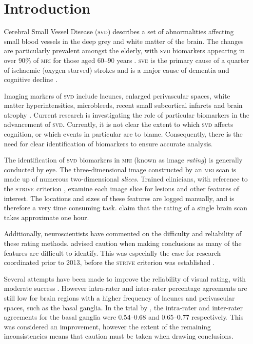 %
%

\chapter{Introduction}\label{s-intro}

{\noindent} Cerebral Small Vessel Disease (\textsc{svd}) describes a set of abnormalities affecting small blood vessels in the deep grey and white matter of the brain. The changes are particularly prevalent amongst the elderly, with \textsc{svd} biomarkers appearing in over 90\% of \textsc{mri} for those aged 60--90 years \citep{deLeeuwF-E2001Pocw}. \textsc{svd} is the primary cause of a quarter of ischaemic (oxygen-starved) strokes \citep{WardlawJ.M.2013Nsfr} and is a major cause of dementia and cognitive decline \citep{NorrvingBo2008Linb}.

Imaging markers of \textsc{svd} include lacunes, enlarged perivascular spaces, white matter hyperintensities, microbleeds, recent small subcortical infarcts and brain atrophy \citep{WardlawJ.M.2013Nsfr}. Current research is investigating the role of particular biomarkers in the advancement of \textsc{svd}. Currently, it is not clear the extent to which \textsc{svd} affects cognition, or which events in particular are to blame. Consequently, there is the need for clear identification of biomarkers to ensure accurate analysis.

The identification of \textsc{svd} biomarkers in \textsc{mri} (known as image \textit{rating}) is generally conducted by eye. The three-dimensional image constructed by an \textsc{mri} scan is made up of numerous two-dimensional \textit{slices}. Trained clinicians, with reference to the \textsc{strive} criterion \citep{WardlawJ.M.2013Nsfr}, examine each image slice for lesions and other features of interest. The locations and sizes of these features are logged manually, and is therefore a very time consuming task. \cite{Heuvel2016} claim that the rating of a single brain scan takes approximate one hour.

Additionally, neuroscientists have commented on the difficulty and reliability of these rating methods. \cite{WardlawJm2013Mosc} advised caution when making conclusions as many of the features are difficult to identify. This was especially the case for research coordinated prior to 2013, before the \textsc{strive} criterion was established \citep{WardlawJ.M.2013Nsfr}.

Several attempts have been made to improve the reliability of visual rating, with moderate success \citep{AdamsH.H.Hieab2013RMfD, PotterGillian2015CPSV}. However intra-rater and inter-rater percentage agreements are still low for brain regions with a higher frequency of lacunes and perivascular spaces, such as the basal ganglia. In the trial by \cite{PotterGillian2015CPSV},  the intra-rater and inter-rater agreements for the basal ganglia were 0.54--0.68 and 0.65--0.77 respectively. This was considered an improvement, however the extent of the remaining inconsistencies means that caution must be taken when drawing conclusions.

